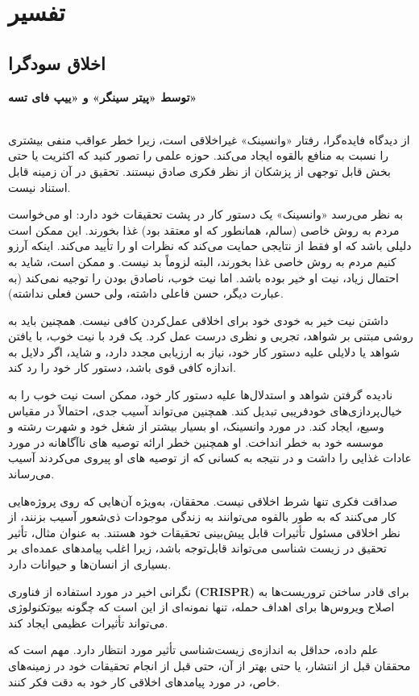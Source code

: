 {
\section*{تفسیر}
\label{sec:تفسیر}


\subsection*{اخلاق سودگرا}
\label{subsec:اخلاق سودگرا}
\textbf{توسط «پیتر سینگر» و «ییپ فای تسه»}
\\\\
}
از دیدگاه فایده‌گرا، رفتار «وانسینک» غیراخلاقی است، زیرا خطر عواقب منفی بیشتری را نسبت به منافع بالقوه ایجاد می‌کند.
حوزه علمی را تصور کنید که اکثریت یا حتی بخش قابل توجهی از پزشکان از نظر فکری صادق نیستند.
تحقیق در آن زمینه قابل استناد نیست.

به نظر می‌رسد «وانسینک» یک دستور کار در پشت تحقیقات خود دارد: او می‌خواست مردم به روش خاصی (سالم، همانطور که او معتقد بود) غذا بخورند.
این ممکن است دلیلی باشد که او فقط از نتایجی حمایت می‌کند که نظرات او را تأیید می‌کند.
اینکه آرزو کنیم مردم به روش خاصی غذا بخورند، البته لزوماً بد نیست.
و ممکن است، شاید به احتمال زیاد، نیت او خیر بوده باشد.
اما نیت خوب، ناصادق بودن را توجیه نمی‌کند (به عبارت دیگر، حسن فاعلی داشته، ولی حسن فعلی نداشته).

داشتن نیت خیر به خودی خود برای اخلاقی عمل‌کردن کافی نیست.
همچنین باید به روشی مبتنی بر شواهد، تجربی و نظری درست عمل کرد.
یک فرد با نیت خوب، با یافتن شواهد یا دلایلی علیه دستور کار خود، نیاز به ارزیابی مجدد دارد، و شاید، اگر دلایل به اندازه کافی قوی باشد، دستور کار خود را رد کند.

نادیده گرفتن شواهد و استدلال‌ها علیه دستور کار خود، ممکن است نیت خوب را به خیال‌پردازی‌های خودفریبی تبدیل کند.
همچنین می‌تواند آسیب جدی، احتمالاً در مقیاس وسیع، ایجاد کند.
در مورد وانسینک، او بسیار بیشتر از شغل خود و شهرت رشته و موسسه خود به خطر انداخت.
او همچنین خطر ارائه توصیه های ناآگاهانه در مورد عادات غذایی را داشت و در نتیجه به کسانی که از توصیه های او پیروی می‌کردند آسیب می‌رساند.

صداقت فکری تنها شرط اخلاقی نیست.
محققان، به‌ویژه آن‌هایی که روی پروژه‌هایی کار می‌کنند که به طور بالقوه می‌توانند به زندگی موجودات ذی‌شعور آسیب بزنند، از نظر اخلاقی مسئول تأثیرات قابل پیش‌بینی تحقیقات خود هستند.
به عنوان مثال، تأثیر تحقیق در زیست شناسی می‌تواند قابل‌توجه باشد، زیرا اغلب پیامدهای عمده‌ای بر بسیاری از انسان‌ها و حیوانات دارد.

نگرانی اخیر در مورد استفاده از فناوری \textenglish{\textbf{(CRISPR)}} برای قادر ساختن تروریست‌ها به اصلاح ویروس‌ها برای اهداف حمله، تنها نمونه‌ای از این است که چگونه بیوتکنولوژی می‌تواند تأثیرات عظیمی ایجاد کند.

علم داده، حداقل به اندازه‌ی زیست‌شناسی تأثیر مورد انتظار دارد.
مهم است که محققان قبل از انتشار، یا حتی بهتر از آن، حتی قبل از انجام تحقیقات خود در زمینه‌های خاص، در مورد پیامدهای اخلاقی کار خود به دقت فکر کنند.



